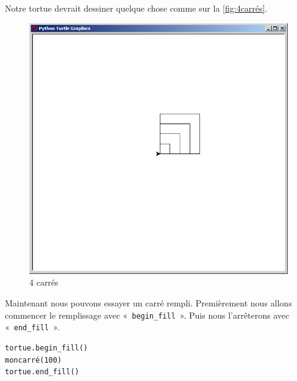 Notre tortue devrait dessiner quelque chose comme sur la \autoref{fig:4carrés}.

\begin{figure}[h!]
\centering
\includegraphics[scale=0.4]{images/4carres}
\caption{4 carrés}\label{fig:4carrés}
\end{figure}

Maintenant nous pouvons essayer un carré rempli. Premièrement nous allons commencer le remplissage avec
 « \texttt{begin\_fill} ». Puis nous l'arrêterons avec  « \texttt{end\_fill} ».

\begin{Verbatim}[frame=single,rulecolor=\color{mbleu}, label=à taper]
tortue.begin_fill()
moncarré(100)
tortue.end_fill()
\end{Verbatim}

